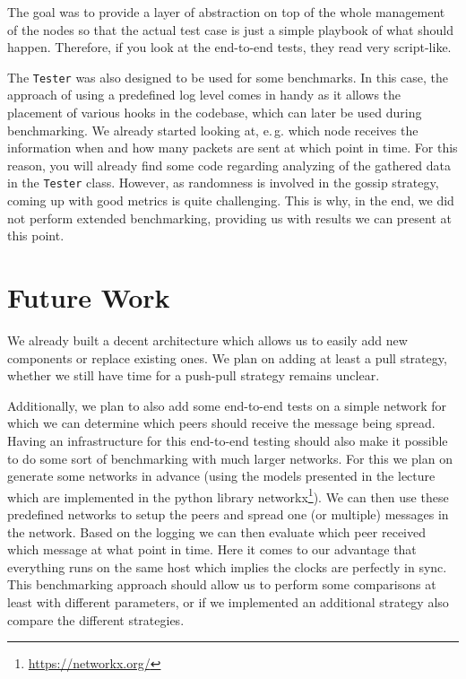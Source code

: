 \documentclass[a4paper,english,10pt,NET]{tumarticle}
\renewcommand{\eg}{\mbox{e.\,g.}\xspace} %
\begin{document}
The goal was to provide a layer of abstraction on top of the whole management of the nodes so that the actual test case is just a simple playbook of what should happen.
Therefore, if you look at the end-to-end tests, they read very script-like.

The \texttt{Tester} was also designed to be used for some benchmarks.
In this case, the approach of using a predefined log level comes in handy as it allows the placement of various hooks in the codebase, which can later be used during benchmarking.
We already started looking at, \eg which node receives the information when and how many packets are sent at which point in time.
For this reason, you will already find some code regarding analyzing of the gathered data in the \texttt{Tester} class.
However, as randomness is involved in the gossip strategy, coming up with good metrics is quite challenging.
This is why, in the end, we did not perform extended benchmarking, providing us with results we can present at this point.

\section{Future Work} \label{sec:future}
We already built a decent architecture which allows us to easily add new components or replace existing ones.
We plan on adding at least a pull strategy, whether we still have time for a push-pull strategy remains unclear.

Additionally, we plan to also add some end-to-end tests on a simple network for which we can determine which peers should receive the message being spread.
Having an infrastructure for this end-to-end testing should also make it possible to do some sort of benchmarking with much larger networks.
For this we plan on generate some networks in advance (using the models presented in the lecture which are implemented in the python library networkx\footnote{\url{https://networkx.org/}}).
We can then use these predefined networks to setup the peers and spread one (or multiple) messages in the network.
Based on the logging we can then evaluate which peer received which message at what point in time.
Here it comes to our advantage that everything runs on the same host which implies the clocks are perfectly in sync.
This benchmarking approach should allow us to perform some comparisons at least with different parameters, or if we implemented an additional strategy also compare the different strategies.
\end{document}
